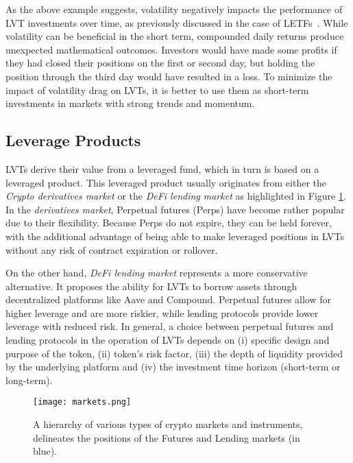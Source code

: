 As the above example suggests, volatility negatively impacts the performance of LVT investments over time, as previously discussed in the case of LETFs~\cite{giese2010performance, trainor2011daily}. While volatility can be beneficial in the short term, compounded daily returns produce unexpected mathematical outcomes. Investors would have made some profits if they had closed their positions on the first or second day, but holding the position through the third day would have resulted in a loss. To minimize the impact of volatility drag on LVTs, it is better to use them as short-term investments in markets with strong trends and momentum.

\subsection{Leverage Products}
LVTs derive their value from a leveraged fund, which in turn is based on a leveraged product. This leveraged product usually originates from either the \textit{Crypto derivatives market} or the \textit{DeFi lending market} as highlighted in Figure \ref{fig:markets}. In the \textit{derivatives market}, Perpetual futures (Perps) have become rather popular due to their flexibility. Because Perps do not expire, they can be held forever, with the additional advantage of being able to make leveraged positions in LVTs without any risk of contract expiration or rollover.

On the other hand, \textit{DeFi lending market} represents a more conservative alternative. It proposes the ability for LVTs to borrow assets through decentralized platforms like Aave and Compound. Perpetual futures allow for higher leverage and are more riskier, while lending protocols provide lower leverage with reduced risk. In general, a choice between perpetual futures and lending protocols in the operation of LVTs depends on (i) specific design and purpose of the token, (ii) token's risk factor, (iii) the depth of liquidity provided by the underlying platform and (iv) the investment time horizon (short-term or long-term).

\begin{figure}[t]
	\texttt{[image: markets.png]}
	\caption[Crypto market hierarchy]{A hierarchy of various types of crypto markets and instruments, delineates the positions of the Futures and Lending markets (in blue).}
	\label{fig:markets}
\end{figure}

